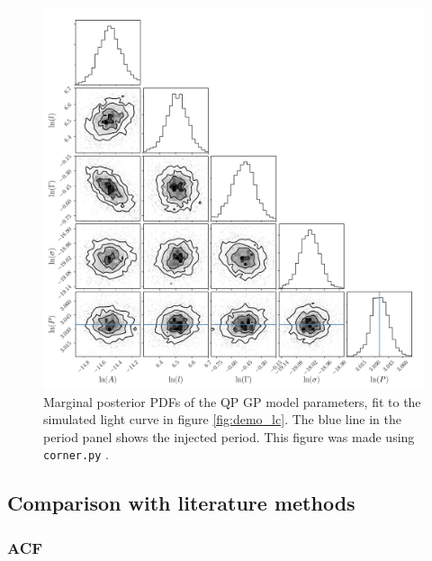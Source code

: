 \documentclass[a4paper,fleqn,usenatbib,useAMS]{mnras}
\newcommand{\Kepler}{{\it Kepler}}
\newcommand{\kepler}{\Kepler}
\begin{document}
\begin{figure}
\begin{center}
\includegraphics[width=6in, clip=true]{figures/corner_plot.pdf}
\caption{Marginal posterior PDFs of the QP GP model parameters, fit to the
    simulated light curve in figure \ref{fig:demo_lc}.
    The blue line in the period panel shows the injected period.
    This figure was made using \texttt{corner.py} \citep{Corner}.}
\label{fig:gp_posteriors}
\end{center}
\end{figure}


\subsection{Comparison with literature methods}
\label{sec:comparison}
\subsubsection{ACF}
\label{sec:acf}

\end{document}
